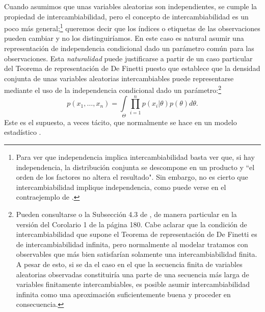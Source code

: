 Cuando asumimos que unas variables aleatorias son independientes, se cumple la propiedad de intercambiabilidad, pero el concepto de intercambiabilidad es un poco más general;\footnote{Para ver que independencia implica intercambiabilidad basta ver que, si hay independencia, la distribución conjunta se descompone en un producto y ``el orden de los factores no altera el resultado". Sin embargo, no es cierto que intercambiabilidad implique independencia, como puede verse en el contraejemplo de \textcite[8]{GP98}.} queremos decir que los índices o etiquetas de las observaciones pueden cambiar y no los distinguiríamos. En este caso es natural asumir una representación de independencia condicional dado un parámetro común para las observaciones. Esta \textit{naturalidad} puede justificarse a partir de un caso particular del Teorema de representación de De Finetti puesto que establece que la densidad conjunta de unas variables aleatorias intercambiables puede representarse mediante el uso de la independencia condicional dado un parámetro:\footnote{Pueden consultarse \textcite[9-12]{GP98} o la Subsección 4.3 de \textcite{BernardoSmith00}, de manera particular en la versión del Corolario 1 de la página 180. Cabe aclarar que la condición de intercambiabilidad que supone el Teorema de representación de De Finetti es de intercambiabilidad infinita, pero normalmente al modelar tratamos con observables que más bien satisfarían solamente una intercambiabilidad finita. A pesar de esto, si se da el caso en el que la secuencia finita de variables aleatorias observadas constituiría una parte de una secuencia más larga de variables finitamente intercambiables, es posible asumir intercambiabilidad infinita como una aproximación suficientemente buena y proceder en consecuencia\parencite[226-227]{BernardoSmith00}.}
\begin{equation} \label{eq:Repr_DeFinetti}
p(x_1,\dots,x_n) = \int\limits_\Theta \prod\limits_{i=1}^n p(x_i|\theta)p(\theta)d\theta.
\end{equation}
Este es el supuesto, a veces tácito, que normalmente se hace en un modelo estadístico \parencite[5]{Gelman13}.\\

